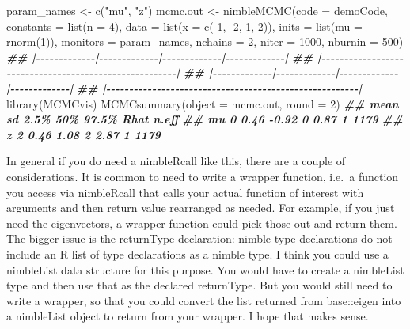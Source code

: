 \documentclass[
  12pt,
]{krantz}
\newenvironment{Shaded}{\begin{snugshade}}{\end{snugshade}}
\newcommand{\AttributeTok}[1]{\textcolor[rgb]{0.77,0.63,0.00}{#1}}
\newcommand{\DecValTok}[1]{\textcolor[rgb]{0.00,0.00,0.81}{#1}}
\newcommand{\DocumentationTok}[1]{\textcolor[rgb]{0.56,0.35,0.01}{\textbf{\textit{#1}}}}
\newcommand{\FunctionTok}[1]{\textcolor[rgb]{0.00,0.00,0.00}{#1}}
\newcommand{\NormalTok}[1]{#1}
\newcommand{\OtherTok}[1]{\textcolor[rgb]{0.56,0.35,0.01}{#1}}
\newcommand{\SpecialCharTok}[1]{\textcolor[rgb]{0.00,0.00,0.00}{#1}}
\newcommand{\StringTok}[1]{\textcolor[rgb]{0.31,0.60,0.02}{#1}}
\begin{document}
\begin{Shaded}
\begin{Highlighting}[]
\NormalTok{param\_names }\OtherTok{\textless{}{-}} \FunctionTok{c}\NormalTok{(}\StringTok{"mu"}\NormalTok{, }\StringTok{"z"}\NormalTok{)}
\NormalTok{mcmc.out }\OtherTok{\textless{}{-}} \FunctionTok{nimbleMCMC}\NormalTok{(}\AttributeTok{code =}\NormalTok{ demoCode, }
                      \AttributeTok{constants =} \FunctionTok{list}\NormalTok{(}\AttributeTok{n =} \DecValTok{4}\NormalTok{),}
                      \AttributeTok{data =} \FunctionTok{list}\NormalTok{(}\AttributeTok{x =} \FunctionTok{c}\NormalTok{(}\SpecialCharTok{{-}}\DecValTok{1}\NormalTok{, }\SpecialCharTok{{-}}\DecValTok{2}\NormalTok{, }\DecValTok{1}\NormalTok{, }\DecValTok{2}\NormalTok{)), }
                      \AttributeTok{inits =} \FunctionTok{list}\NormalTok{(}\AttributeTok{mu =} \FunctionTok{rnorm}\NormalTok{(}\DecValTok{1}\NormalTok{)),}
                      \AttributeTok{monitors =}\NormalTok{ param\_names,}
                      \AttributeTok{nchains =} \DecValTok{2}\NormalTok{, }
                      \AttributeTok{niter =} \DecValTok{1000}\NormalTok{,}
                      \AttributeTok{nburnin =} \DecValTok{500}\NormalTok{)}
\DocumentationTok{\#\# |{-}{-}{-}{-}{-}{-}{-}{-}{-}{-}{-}{-}{-}|{-}{-}{-}{-}{-}{-}{-}{-}{-}{-}{-}{-}{-}|{-}{-}{-}{-}{-}{-}{-}{-}{-}{-}{-}{-}{-}|{-}{-}{-}{-}{-}{-}{-}{-}{-}{-}{-}{-}{-}|}
\DocumentationTok{\#\# |{-}{-}{-}{-}{-}{-}{-}{-}{-}{-}{-}{-}{-}{-}{-}{-}{-}{-}{-}{-}{-}{-}{-}{-}{-}{-}{-}{-}{-}{-}{-}{-}{-}{-}{-}{-}{-}{-}{-}{-}{-}{-}{-}{-}{-}{-}{-}{-}{-}{-}{-}{-}{-}{-}{-}|}
\DocumentationTok{\#\# |{-}{-}{-}{-}{-}{-}{-}{-}{-}{-}{-}{-}{-}|{-}{-}{-}{-}{-}{-}{-}{-}{-}{-}{-}{-}{-}|{-}{-}{-}{-}{-}{-}{-}{-}{-}{-}{-}{-}{-}|{-}{-}{-}{-}{-}{-}{-}{-}{-}{-}{-}{-}{-}|}
\DocumentationTok{\#\# |{-}{-}{-}{-}{-}{-}{-}{-}{-}{-}{-}{-}{-}{-}{-}{-}{-}{-}{-}{-}{-}{-}{-}{-}{-}{-}{-}{-}{-}{-}{-}{-}{-}{-}{-}{-}{-}{-}{-}{-}{-}{-}{-}{-}{-}{-}{-}{-}{-}{-}{-}{-}{-}{-}{-}|}
\FunctionTok{library}\NormalTok{(MCMCvis)}
\FunctionTok{MCMCsummary}\NormalTok{(}\AttributeTok{object =}\NormalTok{ mcmc.out, }\AttributeTok{round =} \DecValTok{2}\NormalTok{)}
\DocumentationTok{\#\#    mean   sd  2.5\% 50\% 97.5\% Rhat n.eff}
\DocumentationTok{\#\# mu    0 0.46 {-}0.92   0  0.87    1  1179}
\DocumentationTok{\#\# z     2 0.46  1.08   2  2.87    1  1179}
\end{Highlighting}
\end{Shaded}

In general if you do need a nimbleRcall like this, there are a couple of considerations. It is common to need to write a wrapper function, i.e.~a function you access via nimbleRcall that calls your actual function of interest with arguments and then return value rearranged as needed. For example, if you just need the eigenvectors, a wrapper function could pick those out and return them. The bigger issue is the returnType declaration: nimble type declarations do not include an R list of type declarations as a nimble type. I think you could use a nimbleList data structure for this purpose. You would have to create a nimbleList type and then use that as the declared returnType. But you would still need to write a wrapper, so that you could convert the list returned from base::eigen into a nimbleList object to return from your wrapper. I hope that makes sense.
\end{document}
